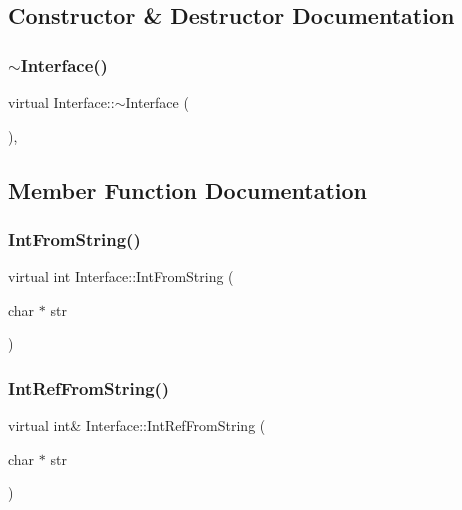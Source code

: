 \subsection{Constructor \& Destructor Documentation}
\mbox{\label{classInterface_a67eca71a4ef8d28dc959dd495e2b2b59}} 
\subsubsection{\texorpdfstring{$\sim$Interface()}{~Interface()}}
{\footnotesize\ttfamily virtual Interface\+::$\sim$\+Interface (\begin{DoxyParamCaption}{ }\end{DoxyParamCaption})\hspace{0.3cm}{\ttfamily [inline]}, {\ttfamily [virtual]}}



\subsection{Member Function Documentation}
\mbox{\label{classInterface_ab34c8a5fd2236a6b009f86a4e5851b61}} 
\subsubsection{\texorpdfstring{IntFromString()}{IntFromString()}}
{\footnotesize\ttfamily virtual int Interface\+::\+Int\+From\+String (\begin{DoxyParamCaption}\item[{char $\ast$}]{str }\end{DoxyParamCaption})\hspace{0.3cm}{\ttfamily [pure virtual]}}

\mbox{\label{classInterface_ab93276de67e60c44fd775d4c139aa8e1}} 
\subsubsection{\texorpdfstring{IntRefFromString()}{IntRefFromString()}}
{\footnotesize\ttfamily virtual int\& Interface\+::\+Int\+Ref\+From\+String (\begin{DoxyParamCaption}\item[{char $\ast$}]{str }\end{DoxyParamCaption})\hspace{0.3cm}{\ttfamily [pure virtual]}}

